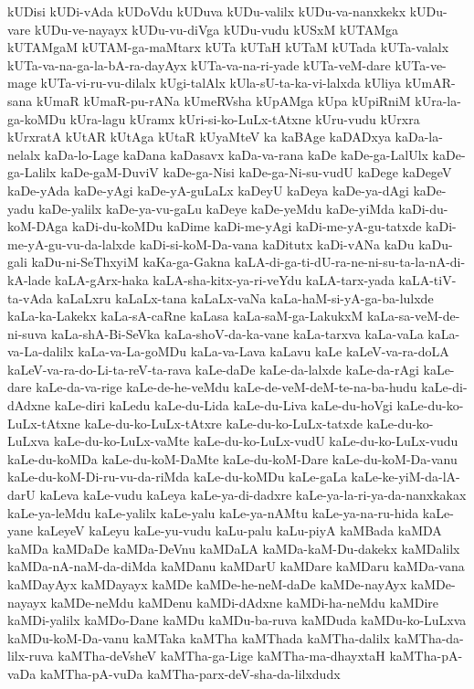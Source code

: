 {kUDisi
kUDi-vAda
kUDoVdu
kUDuva
kUDu-valilx
kUDu-va-nanxkekx
kUDu-vare
kUDu-ve-nayayx
kUDu-vu-diVga
kUDu-vudu
kUSxM
kUTAMga
kUTAMgaM
kUTAM-ga-maMtarx
kUTa
kUTaH
kUTaM
kUTada
kUTa-valalx
kUTa-va-na-ga-la-bA-ra-dayAyx
kUTa-va-na-ri-yade
kUTa-veM-dare
kUTa-ve-mage
kUTa-vi-ru-vu-dilalx
kUgi-talAlx
kUla-sU-ta-ka-vi-lalxda
kUliya
kUmAR-sana
kUmaR
kUmaR-pu-rANa
kUmeRVsha
kUpAMga
kUpa
kUpiRniM
kUra-la-ga-koMDu
kUra-lagu
kUramx
kUri-si-ko-LuLx-tAtxne
kUru-vudu
kUrxra
kUrxratA
kUtAR
kUtAga
kUtaR
kUyaMteV
ka
kaBAge
kaDADxya
kaDa-la-nelalx
kaDa-lo-Lage
kaDana
kaDasavx
kaDa-va-rana
kaDe
kaDe-ga-LalUlx
kaDe-ga-Lalilx
kaDe-gaM-DuviV
kaDe-ga-Nisi
kaDe-ga-Ni-su-vudU
kaDege
kaDegeV
kaDe-yAda
kaDe-yAgi
kaDe-yA-guLaLx
kaDeyU
kaDeya
kaDe-ya-dAgi
kaDe-yadu
kaDe-yalilx
kaDe-ya-vu-gaLu
kaDeye
kaDe-yeMdu
kaDe-yiMda
kaDi-du-koM-DAga
kaDi-du-koMDu
kaDime
kaDi-me-yAgi
kaDi-me-yA-gu-tatxde
kaDi-me-yA-gu-vu-da-lalxde
kaDi-si-koM-Da-vana
kaDitutx
kaDi-vANa
kaDu
kaDu-gali
kaDu-ni-SeThxyiM
kaKa-ga-Gakna
kaLA-di-ga-ti-dU-ra-ne-ni-su-ta-la-nA-di-kA-lade
kaLA-gArx-haka
kaLA-sha-kitx-ya-ri-veYdu
kaLA-tarx-yada
kaLA-tiV-ta-vAda
kaLaLxru
kaLaLx-tana
kaLaLx-vaNa
kaLa-haM-si-yA-ga-ba-lulxde
kaLa-ka-Lakekx
kaLa-sA-caRne
kaLasa
kaLa-saM-ga-LakukxM
kaLa-sa-veM-de-ni-suva
kaLa-shA-Bi-SeVka
kaLa-shoV-da-ka-vane
kaLa-tarxva
kaLa-vaLa
kaLa-va-La-dalilx
kaLa-va-La-goMDu
kaLa-va-Lava
kaLavu
kaLe
kaLeV-va-ra-doLA
kaLeV-va-ra-do-Li-ta-reV-ta-rava
kaLe-daDe
kaLe-da-lalxde
kaLe-da-rAgi
kaLe-dare
kaLe-da-va-rige
kaLe-de-he-veMdu
kaLe-de-veM-deM-te-na-ba-hudu
kaLe-di-dAdxne
kaLe-diri
kaLedu
kaLe-du-Lida
kaLe-du-Liva
kaLe-du-hoVgi
kaLe-du-ko-LuLx-tAtxne
kaLe-du-ko-LuLx-tAtxre
kaLe-du-ko-LuLx-tatxde
kaLe-du-ko-LuLxva
kaLe-du-ko-LuLx-vaMte
kaLe-du-ko-LuLx-vudU
kaLe-du-ko-LuLx-vudu
kaLe-du-koMDa
kaLe-du-koM-DaMte
kaLe-du-koM-Dare
kaLe-du-koM-Da-vanu
kaLe-du-koM-Di-ru-vu-da-riMda
kaLe-du-koMDu
kaLe-gaLa
kaLe-ke-yiM-da-lA-darU
kaLeva
kaLe-vudu
kaLeya
kaLe-ya-di-dadxre
kaLe-ya-la-ri-ya-da-nanxkakax
kaLe-ya-leMdu
kaLe-yalilx
kaLe-yalu
kaLe-ya-nAMtu
kaLe-ya-na-ru-hida
kaLe-yane
kaLeyeV
kaLeyu
kaLe-yu-vudu
kaLu-palu
kaLu-piyA
kaMBada
kaMDA
kaMDa
kaMDaDe
kaMDa-DeVnu
kaMDaLA
kaMDa-kaM-Du-dakekx
kaMDalilx
kaMDa-nA-naM-da-diMda
kaMDanu
kaMDarU
kaMDare
kaMDaru
kaMDa-vana
kaMDayAyx
kaMDayayx
kaMDe
kaMDe-he-neM-daDe
kaMDe-nayAyx
kaMDe-nayayx
kaMDe-neMdu
kaMDenu
kaMDi-dAdxne
kaMDi-ha-neMdu
kaMDire
kaMDi-yalilx
kaMDo-Dane
kaMDu
kaMDu-ba-ruva
kaMDuda
kaMDu-ko-LuLxva
kaMDu-koM-Da-vanu
kaMTaka
kaMTha
kaMThada
kaMTha-dalilx
kaMTha-da-lilx-ruva
kaMTha-deVsheV
kaMTha-ga-Lige
kaMTha-ma-dhayxtaH
kaMTha-pA-vaDa
kaMTha-pA-vuDa
kaMTha-parx-deV-sha-da-lilxdudx
}
